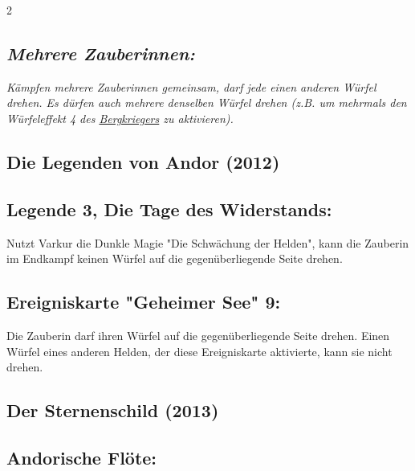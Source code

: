 \documentclass[10pt, a4paper, oneside]{book}
\newcommand{\fan}[1]{\textit{#1}}
\begin{document}
\begin{multicols*}{2}
\begin{nobgcolor}
\subsection{\fan{Mehrere Zauberinnen:}}

\fan{Kämpfen mehrere Zauberinnen gemeinsam, darf jede einen anderen Würfel drehen. Es dürfen auch mehrere denselben Würfel drehen (z.B. um mehrmals den Würfeleffekt 4 des \hyperref[Bergkrieger]{Bergkriegers} zu aktivieren).}

\end{nobgcolor}




\begin{bgcolor}

\section{Die Legenden von Andor (2012)}


\subsection{Legende 3, Die Tage des Widerstands:}

Nutzt Varkur die Dunkle Magie "Die Schwächung der Helden", kann die Zauberin im Endkampf keinen Würfel auf die gegenüberliegende Seite drehen.
\supercite{DLvA3:Die_Schwächung_der_Helden}


\subsection{Ereigniskarte "Geheimer See" 9:}

Die Zauberin darf ihren Würfel auf die gegenüberliegende Seite drehen.
\supercite{DLvA:Ereigniskarte_Geheimer_See_9}
Einen Würfel eines anderen Helden, der diese Ereigniskarte aktivierte, kann sie nicht drehen.


\end{bgcolor}



\columnbreak


\begin{bgcolor}
\section{Der Sternenschild (2013)}


\subsection{Andorische Flöte:}


\end{bgcolor}
\end{multicols*}
\end{document}
